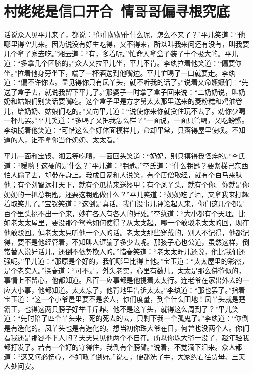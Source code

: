 \documentclass[12pt,oneside]{book}
\begin{document}
\chapter{村姥姥是信口开合~情哥哥偏寻根究底}
话说众人见平儿来了，都说：“你们奶奶作什么呢，怎么不来了？”平儿笑道：“他哪里得空儿来。因为说没有好生吃得，又不得来，所以叫我来问还有没有，叫我要几个拿了家去吃。”湘云道：“有，多着呢。”忙命人拿盒子装了十个极大的。平儿道：“多拿几个团脐的。”众人又拉平儿坐，平儿不肯。李纨拉着他笑道：“偏要你坐。”拉着他身旁坐下，端了一杯酒送到他嘴边。平儿忙喝了一口就要走。李纨道：“偏不许你去。显见得你只有凤丫头，就不听我的话了。”说着又命嬷嬷们：“先送了盒子去，就说我留下平儿了。”那婆子一时拿了盒子回来说：“二奶奶说，叫奶奶和姑娘们别笑话要嘴吃。这个盒子里是方才舅太太那里送来的菱粉糕和鸡油卷儿，给奶奶、姑娘们吃的。”又向平儿道：“说使你来你就贪住玩不去了。劝你少喝一杯儿罢。”平儿笑道：“多喝了又把我怎么样？”一面说，一面只管喝，又吃螃蟹。李纨揽着他笑道：“可惜这么个好体面模样儿，命却平常，只落得屋里使唤。不知道的人，谁不拿你当作奶奶、太太看。”

平儿一面和宝钗、湘云等吃喝，一面回头笑道：“奶奶，别只摸得我怪痒的。”李氏道：“嗳哟！这硬的是什么？”平儿道：“钥匙。”李氏道：“什么钥匙？要紧梯己东西怕人偷了去，却带在身上。我成日家和人说笑，有个唐僧取经，就有个白马来驮他；有个刘智远打天下，就有个瓜精来送盔甲；有个凤丫头，就有个你。你就是你奶奶的一把总钥匙，还要这钥匙做什么？”平儿笑道：“奶奶吃了酒，又拿我来打趣着取笑儿了。”宝钗笑道：“这倒是真话。我们没事儿评论起人来，你们这几个都是百个里头挑不出一个来，妙在各人有各人的好处。”李纨道：“大小都有个天理。比如老太太屋里，要没那个鸳鸯如何使得？从太太起，哪一个敢驳老太太的回，现在他敢驳回。偏老太太只听他一个人的话。老太太那些穿戴的，别人不记得，他都记得，要不是他经管着，不知叫人诓骗了多少去呢。那孩子心也公道，虽然这样，倒常替人说好话儿，还倒不依势欺人的。”惜春笑道：“老太太昨儿还说，他比我们还强呢。”平儿道：“那原是个好的，我们哪里比得上他。”宝玉道：“太太屋里的彩霞，是个老实人。”探春道：“可不是，外头老实，心里有数儿。太太是那么佛爷似的，事情上不留心，他都知道。凡百一应事都是他提着太太行。连老爷在家出外去的一应大小事，他都知道。太太忘了，他背地里告诉太太。”李纨道：“那也罢了。”指着宝玉道：“这一个小爷屋里要不是袭人，你们度量，到个什么田地！凤丫头就是楚霸王，也得这两只膀子好举千斤鼎。他不是这丫头，就得这么周到了？”平儿笑道：“先时陪了四个丫头来，死的死去的去，只剩下我一个孤鬼了。”李纨道：“你倒是有造化的。凤丫头也是有造化的。想当初你珠大爷在日，何曾也没两个人。你们看我还是那容不下人的？天天只见他两个不自在。所以你珠大爷一没了，趁年轻我都打发了。若有一个好的守得住，我倒有个膀臂。”说着，不觉滴下泪来。众人都道：“这又何必伤心，不如散了倒好。”说着，便都洗了手，大家约着往贾母、王夫人处问安。
\end{document}
